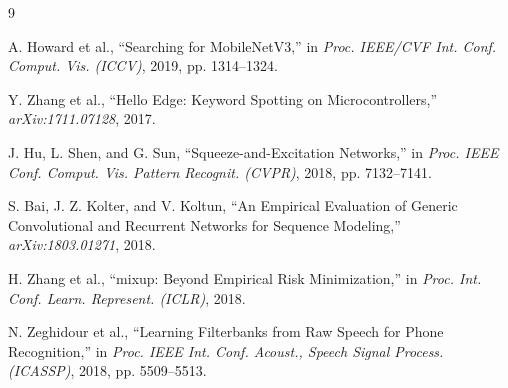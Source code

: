\documentclass[conference]{IEEEtran}
\begin{document}
\begin{thebibliography}{9}

A. Howard et al., ``Searching for MobileNetV3,'' in \textit{Proc. IEEE/CVF Int. Conf. Comput. Vis. (ICCV)}, 2019, pp. 1314--1324.

Y. Zhang et al., ``Hello Edge: Keyword Spotting on Microcontrollers,'' \textit{arXiv:1711.07128}, 2017.

J. Hu, L. Shen, and G. Sun, ``Squeeze-and-Excitation Networks,'' in \textit{Proc. IEEE Conf. Comput. Vis. Pattern Recognit. (CVPR)}, 2018, pp. 7132--7141.

S. Bai, J. Z. Kolter, and V. Koltun, ``An Empirical Evaluation of Generic Convolutional and Recurrent Networks for Sequence Modeling,'' \textit{arXiv:1803.01271}, 2018.

H. Zhang et al., ``mixup: Beyond Empirical Risk Minimization,'' in \textit{Proc. Int. Conf. Learn. Represent. (ICLR)}, 2018.

N. Zeghidour et al., ``Learning Filterbanks from Raw Speech for Phone Recognition,'' in \textit{Proc. IEEE Int. Conf. Acoust., Speech Signal Process. (ICASSP)}, 2018, pp. 5509--5513.

\end{thebibliography}
\end{document}
